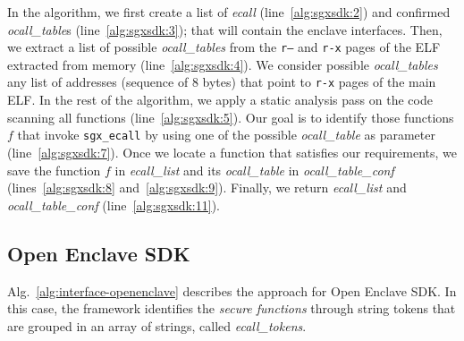 In the algorithm, we first create a list of \emph{ecall}
(line~\ref{alg:sgxsdk:2}) and confirmed \emph{ocall\_table}s
(line~\ref{alg:sgxsdk:3}); that will contain the enclave interfaces.
Then, we extract a list of possible \emph{ocall\_tables} from the \texttt{r--}
and \texttt{r-x} pages of the ELF extracted from memory 
(line~\ref{alg:sgxsdk:4}).
We consider possible \emph{ocall\_tables} any list of addresses (\ie sequence
of $8$ bytes) that point to \texttt{r-x} pages of the main ELF.
In the rest of the algorithm, we apply a static analysis pass on the code
scanning all functions (line~\ref{alg:sgxsdk:5}).
Our goal is to identify those functions $f$ that invoke \texttt{sgx\_ecall} by
using one of the possible \emph{ocall\_table} as parameter
(line~\ref{alg:sgxsdk:7}).
Once we locate a function that satisfies our requirements, we save the function
$f$ in \emph{ecall\_list} and its \emph{ocall\_table} in
\emph{ocall\_table\_conf} (lines~\ref{alg:sgxsdk:8} and~\ref{alg:sgxsdk:9}).
Finally, we return \emph{ecall\_list} and \emph{ocall\_table\_conf}
(line~\ref{alg:sgxsdk:11}).

\subsection{Open Enclave SDK}
Alg.~\ref{alg:interface-openenclave} describes the approach for Open Enclave
SDK.
In this case, the framework identifies the \emph{secure functions} through
string tokens that are grouped in an array of strings, called
\emph{ecall\_tokens}.

